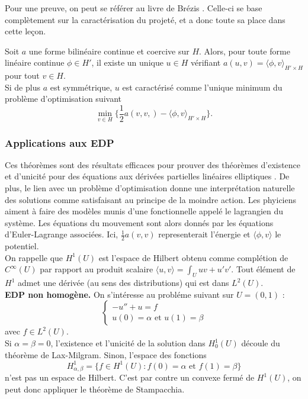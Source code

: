 Pour une preuve, on peut se référer au livre de Brézis \cite{brezis} \cite{brezis2010}. Celle-ci se base complètement sur la caractérisation du projeté, et a donc toute sa place dans cette leçon.\\

\begin{cor}
Soit $a$ une forme bilinéaire continue et coercive sur $H$. Alors, pour toute forme linéaire continue $\phi\in H'$, il existe un unique $u\in H$ vérifiant $a(u,v)= \langle \phi, v\rangle_{H'\times H}$ pour tout $v\in H$.\\

Si de plus $a$ est symmétrique, $u$ est caractérisé comme l'unique minimum du problème d'optimisation suivant
\[\min_{v\in H} \{\frac{1}{2} a(v,v,)-\langle \phi,v\rangle_{H'\times H}\}.\]
\end{cor}

\subsubsection{Applications aux EDP}

Ces théorèmes sont des résultats efficaces pour prouver des théorèmes d'existence et d'unicité pour des équations aux dérivées partielles linéaires elliptiques \cite{brezis2010}. De plus, le lien avec un problème d'optimisation donne une interprétation naturelle des solutions comme satisfaisant au principe de la moindre action. Les phyiciens aiment à faire des modèles munis d'une fonctionnelle appelé le lagrangien du système. Les équations du mouvement sont alors donnés par les équations d'Euler-Lagrange associées. Ici, $\frac{1}{2}a(v,v)$ representerait l'énergie et $\langle \phi , v\rangle$ le potentiel.\\

On rappelle que $H^1(U)$ est l'espace de Hilbert obtenu comme complétion de $C^\infty(U)$ par rapport au produit scalaire $\langle u,v \rangle = \int_U uv +u'v'$. Tout élément de $H^1$ admet une dérivée (au sens des distributions) qui est dans $L^2(U)$.\\

 \textbf{EDP non homogène.} On s'intéresse au probléme suivant sur $U=(0,1)$ :
\[\left\{\begin{array}{c}-u'' +u =f \\ u(0)=\alpha \text{ et } u(1)=\beta \end{array}\right.\]
avec $f\in L^2(U)$.\\

Si $\alpha=\beta=0$, l'existence et l'unicité de la solution dans $H_0^1(U)$ découle du théorème de Lax-Milgram. Sinon, l'espace des fonctions
\[H_{\alpha,\beta}^1 = \{ f\in H^1(U) : f(0)=\alpha \text{ et } f(1)=\beta \}\]
n'est pas un espace de Hilbert. C'est par contre un convexe fermé de $H^1(U)$, on peut donc appliquer le théorème de Stampacchia.\\

